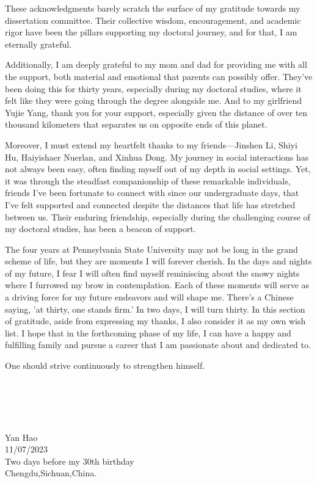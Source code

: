 These acknowledgments barely scratch the surface of my gratitude towards my dissertation committee. Their collective wisdom, encouragement, and academic rigor have been the pillars supporting my doctoral journey, and for that, I am eternally grateful.

Additionally, I am deeply grateful to my mom and dad for providing me with all the support, both material and emotional that parents can possibly offer. They've been doing this for thirty years, especially during my doctoral studies, where it felt like they were going through the degree alongside me. And to my girlfriend Yujie Yang, thank you for your support, especially given the distance of over ten thousand kilometers that separates us on opposite ends of this planet.

Moreover, I must extend my heartfelt thanks to my friends—Jinshen Li, Shiyi Hu, Haiyishaer Nuerlan, and Xinhua Dong. My journey in social interactions has not always been easy, often finding myself out of my depth in social settings. Yet, it was through the steadfast companionship of these remarkable individuals, friends I've been fortunate to connect with since our undergraduate days, that I've felt supported and connected despite the distances that life has stretched between us. Their enduring friendship, especially during the challenging course of my doctoral studies, has been a beacon of support.

The four years at Pennsylvania State University may not be long in the grand scheme of life, but they are moments I will forever cherish. In the days and nights of my future, I fear I will often find myself reminiscing about the snowy nights where I furrowed my brow in contemplation. Each of these moments will serve as a driving force for my future endeavors and will shape me. There's a Chinese saying, 'at thirty, one stands firm.' In two days, I will turn thirty. In this section of gratitude, aside from expressing my thanks, I also consider it as my own wish list. I hope that in the forthcoming phase of my life, I can have a happy and fulfilling family and pursue a career that I am passionate about and dedicated to.

One should strive continuously to strengthen himself.
\\
\\
\\
\\
\\
\\
Yan Hao
\\
11/07/2023
\\
Two days before my 30th birthday
\\
Chengdu,Sichuan,China.%
